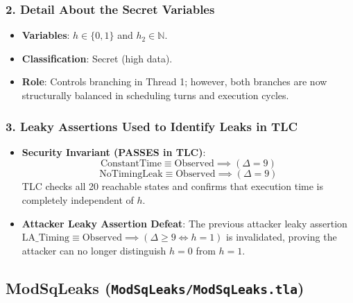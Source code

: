 \documentclass[a4paper,11pt]{article}
\begin{document}
\subsubsection{2. Detail About the Secret Variables}
\begin{itemize}
    \item \textbf{Variables}: $h \in \{0, 1\}$ and $h_2 \in \mathbb{N}$.
    \item \textbf{Classification}: Secret (high data).
    \item \textbf{Role}: Controls branching in Thread 1; however, both branches are now structurally balanced in scheduling turns and execution cycles.
\end{itemize}

\subsubsection{3. Leaky Assertions Used to Identify Leaks in TLC}
\begin{itemize}
    \item \textbf{Security Invariant (PASSES in TLC)}:
    $$\text{ConstantTime} \equiv \text{Observed} \implies (\Delta = 9)$$
    $$\text{NoTimingLeak} \equiv \text{Observed} \implies (\Delta = 9)$$
    TLC checks all 20 reachable states and confirms that execution time is completely independent of $h$.
    \item \textbf{Attacker Leaky Assertion Defeat}:
    The previous attacker leaky assertion $\text{LA\_Timing} \equiv \text{Observed} \implies (\Delta \ge 9 \iff h = 1)$ is invalidated, proving the attacker can no longer distinguish $h = 0$ from $h = 1$.
\end{itemize}

\bigskip

\subsection{ModSqLeaks (\texttt{ModSqLeaks/ModSqLeaks.tla})}
\end{document}
